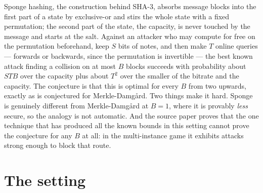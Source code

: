 \documentclass{conjura-conjecture}
\begin{document}

\vspace{0.4em}

\begin{informalconjecture}
Sponge hashing, the construction behind SHA-3, absorbs message blocks
into the first part of a state by exclusive-or and stirs the whole
state with a fixed permutation; the second part of the state, the
capacity, is never touched by the message and starts at the salt.
Against an attacker who may compute for free on the permutation
beforehand, keep $S$ bits of notes, and then make $T$ online queries
--- forwards or backwards, since the permutation is invertible --- the
best known attack finding a collision on at most $B$ blocks succeeds
with probability about $STB$ over the capacity plus about $T^{2}$ over
the smaller of the bitrate and the capacity. The conjecture is that
this is optimal for every $B$ from two upwards, exactly as is
conjectured for Merkle-Damg\aa{}rd. Two things make it hard. Sponge is
genuinely different from Merkle-Damg\aa{}rd at $B = 1$, where it is
provably \emph{less} secure, so the analogy is not automatic. And the
source paper proves that the one technique that has produced all the
known bounds in this setting cannot prove the conjecture for any $B$ at
all: in the multi-instance game it exhibits attacks strong enough to
block that route.
\end{informalconjecture}

\section{The setting}\label{sec:setting}
\end{document}
